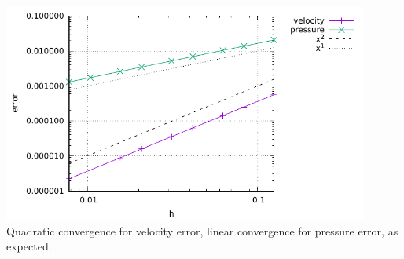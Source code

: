 \begin{center}
\includegraphics[width=12cm]{python_codes/fieldstone_01/errors.pdf}\\
{\captionfont Quadratic convergence for velocity error, 
linear convergence for pressure error, as expected.}
\end{center}

